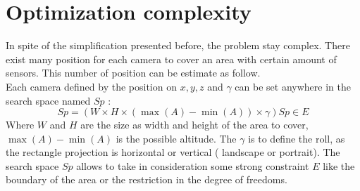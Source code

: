 %    


 
 \section{Optimization complexity} \label{sec:OptimizationComplexity}
 
In spite of the simplification presented before, the problem stay complex. There exist many position for each camera to cover an area with certain amount of sensors. This number of position can be estimate as follow.\\   
Each camera defined by the position on $x, y, z $ and $ \gamma$ can be set anywhere in the search space  named $Sp$ : 
\begin{equation}\label{eq:SearchSpace}
 Sp=(W\times H \times ( \max(A)-\min(A)) \times \gamma )  Sp \in E 
\end{equation}
Where $W$ and $H$ are the size as width and height of the area to cover, $\max(A)-\min(A)$  is the possible altitude. The $\gamma$ is to define the roll, as the rectangle projection is horizontal or vertical ( landscape or portrait). The search space $Sp$ allows to take in consideration some strong constraint $E$ like the boundary of the area or the restriction in the degree of freedoms.


